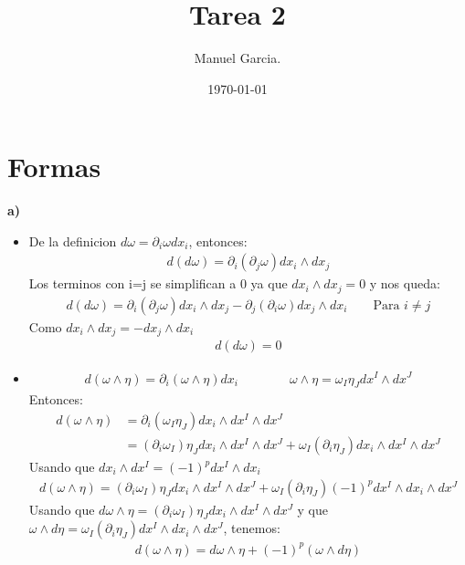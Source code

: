 \documentclass{article}
\title{Tarea 2}
\author{Manuel Garcia.}
\date{\today}
\begin{document}
\maketitle

\section{Formas}

\textbf{a) } 
\begin{itemize}
  \item De la definicion $ d\omega = \partial_i \omega dx_i $, entonces: 
    \begin{gather*}
      d(d\omega) = \partial_i(\partial_j\omega)dx_i \wedge dx_j 
    \end{gather*}
    Los terminos con i=j se simplifican a 0 ya que $ dx_i\wedge dx_j= 0 $ y nos queda:
    \begin{gather*}
      d(d\omega) =  \partial_i(\partial_j\omega)dx_i \wedge dx_j - \partial_j(\partial_i\omega)dx_j \wedge dx_i \qquad \text{Para }i\neq j
    \end{gather*}
    Como $ dx_i\wedge dx_j = - dx_j \wedge dx_i  $ 
    \begin{gather*}
      d(d\omega) = 0 
    \end{gather*}

  \item 
  \begin{gather}
    d(\omega \wedge \eta) = \partial_i(\omega\wedge \eta) dx_i \qquad \qquad \omega \wedge \eta = \omega_I \eta_J dx^I\wedge dx^J
  \end{gather}
  Entonces: 
  \begin{align*}
    d(\omega \wedge \eta) &=  \partial_i(\omega_I \eta_J) dx_i \wedge dx^I \wedge dx^J\\
             &= (\partial_i\omega_I) \eta_J dx_i \wedge dx^I \wedge dx^J + \omega_I (\partial_i \eta_J) dx_i \wedge dx^I \wedge dx^J
  \end{align*}
  Usando que $ dx_i \wedge dx^I = (-1)^p dx^I\wedge dx_i  $
  \begin{gather*}
    d(\omega \wedge \eta) = (\partial_i\omega_I) \eta_J dx_i \wedge dx^I \wedge dx^J + \omega_I (\partial_i \eta_J) (-1)^p dx^I\wedge dx_i \wedge dx^J
  \end{gather*}
  Usando que $ d\omega \wedge \eta = (\partial_i\omega_I) \eta_J dx_i\wedge dx^I \wedge dx^J $ y que $ \omega \wedge d\eta = \omega_I (\partial_i \eta_J) dx^I \wedge dx_i \wedge dx^J $, tenemos:
  \begin{gather*}
    d(\omega\wedge\eta) = d\omega \wedge \eta + (-1)^p(\omega \wedge d\eta) 
  \end{gather*}


\end{itemize}
\end{document}
